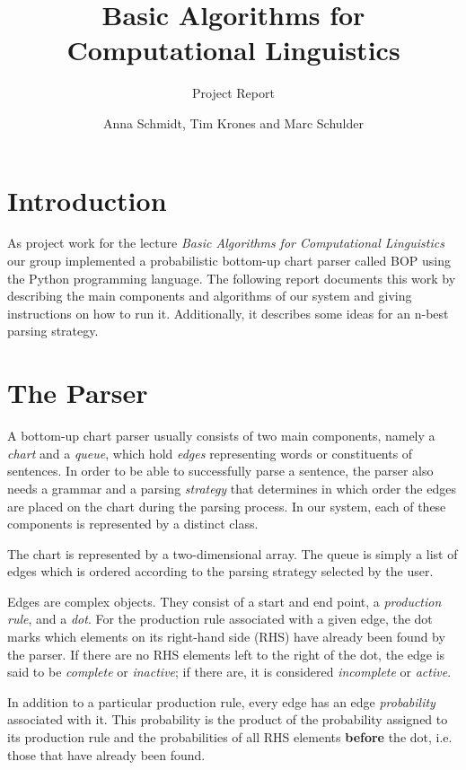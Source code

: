 \documentclass[11pt, titlepage, a4paper]{scrartcl}		%
\begin{document}
\title{Basic Algorithms for Computational Linguistics}
\subtitle{Project Report}
\author{Anna Schmidt, Tim Krones and Marc Schulder}
\maketitle

\section{Introduction}
\label{sec:intro}
As project work for the lecture \emph{Basic Algorithms for Computational Linguistics} our group implemented a probabilistic bottom-up chart parser called BOP using the Python programming language. The following report documents this work by describing the main components and algorithms of our system and giving instructions on how to run it. Additionally, it describes some ideas for an n-best parsing strategy.


\section{The Parser}
\label{sec:basic}
A bottom-up chart parser usually consists of two main components, namely a \emph{chart} and a \emph{queue}, which hold \emph{edges} representing words or constituents of sentences. In order to be able to successfully parse a sentence, the parser also needs a grammar and a parsing \emph{strategy} that determines in which order the edges are placed on the chart during the parsing process. In our system, each of these components is represented by a distinct class.

The chart is represented by a two-dimensional array. The queue is simply a list of edges which is ordered according to the parsing strategy selected by the user.

Edges are complex objects. They consist of a start and end point, a \emph{production rule}, and a \emph{dot}. For the production rule associated with a given edge, the dot marks which elements on its right-hand side (RHS) have already been found by the parser. If there are no RHS elements left to the right of the dot, the edge is said to be \emph{complete} or \emph{inactive}; if there are, it is considered \emph{incomplete} or \emph{active}.

In addition to a particular production rule, every edge has an edge \emph{probability} associated with it. This probability is the product of the probability assigned to its production rule and the probabilities of all RHS elements \textbf{before} the dot, i.e. those that have already been found.
\end{document}
